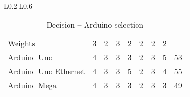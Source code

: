 \begin{table}[H]
\begin{tabular}{L{0.2\textwidth} L{0.6\textwidth}}
		\begin{tabular}{l|lllllll|l}
		                     & \rot{Reliability} & \rot{Resilience} & \rot{Performance} & \rot{Interoperability} & \rot{Security} & \rot{Scalability} & \rot{Cost} & \rot{\textbf{Score}} \\ \hline
		Weights              & 3 & 2 & 3 & 2 & 2 & 2 & 2 \\ \hline
		Arduino Uno          & 4                 & 3                & 3                 & 3                      & 2              & 3                 & 5          & 53                   \\ 
		Arduino Uno Ethernet & 4                 & 3                & 3                 & 5                      & 2              & 3                 & 4          & 55                   \\
		Arduino Mega         & 4                 & 3                & 3                 & 3                      & 2              & 3                 & 3          & 49                   \\
	\end{tabular} \\                 
			
	\\ \bottomrule
	\end{tabular}
	\caption{Decision -- Arduino selection}
	\label{table:linux}
\end{table}

